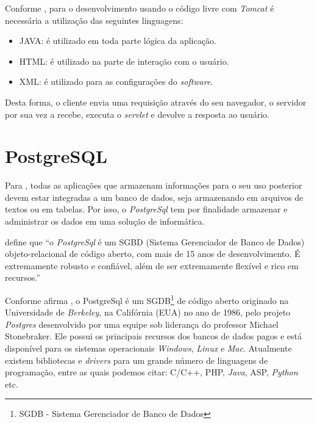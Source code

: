 	\par Conforme , para o desenvolvimento usando o código
livre com \textit{Tomcat} é necessária a utilização das seguintes linguagens:
	
	\begin{itemize}
	  
	  \item JAVA: é utilizado em toda parte lógica da aplicação.
	  
	  \item HTML: é utilizado na parte de interação com o usuário.
	  
	  \item XML: é utilizado para as configurações do \textit{software}. 
	
	\end{itemize}
 
 
 
	\par Desta forma, o cliente envia uma requisição através do seu navegador, o
servidor por sua vez a recebe, executa o \textit{servlet} e devolve a resposta
ao usuário.

\section{PostgreSQL}

	\par Para , todas as aplicações que armazenam
informações para o seu uso posterior devem estar integradas a um banco de
dados, seja armazenando em arquivos de textos ou em tabelas. Por isso, o
\textit{PostgreSql} tem por finalidade armazenar e administrar os dados em uma
solução de informática.
	
	\par {} define que “o \textit{PostgreSql} é
um SGBD (Sistema Gerenciador de Banco de Dados) objeto-relacional de código
aberto, com mais de 15 anos de desenvolvimento. É extremamente robusto e
confiável, além de ser extremamente flexível e rico em recursos.” 

	\par Conforme afirma , o PostgreSql é um
SGDB\footnote{SGDB - Sistema Gerenciador de Banco de Dados } de código aberto
originado na Universidade de \textit{Berkeley}, na Califórnia (EUA) no ano de
1986, pelo projeto \textit{Postgres} desenvolvido por uma equipe sob liderança
do professor Michael Stonebraker. Ele possui os principais recursos dos bancos
de dados pagos e está disponível para os sistemas operacionais
\textit{Windows}, \textit{Linux} e \textit{Mac}. Atualmente existem bibliotecas
e \textit{drivers} para um grande número de linguagens de programação, entre as
quais podemos citar: C/C++, PHP, \textit{Java}, ASP, \textit{Python} etc.

